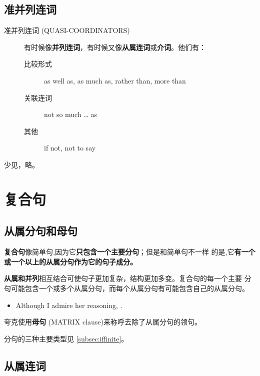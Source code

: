 \subsection{准并列连词}
\label{subsec:quasicoor}

\begin{description}
\item[准并列连词 (QUASI-COORDINATORS)]  有时候像\textbf{并列连词}，有时候又像\textbf{从属连词}或\textbf{介词}。他们有：
  \begin{description}
  \item[比较形式] as well as, as much as, rather than, more than

  \item[关联连词] not so much \ldots{} as
  \item[其他] if not, not to say
  \end{description}
\end{description}

少见，略。

\section{复合句}

\subsection{从属分句和母句}

\textbf{复合句}像简单句,因为它\textbf{只包含一个主要分句}；但是和简单句不一样
的是,它\textbf{有一个或一个以上的从属分句作为它的句子成分。}

\textbf{从属和并列}相互结合可使句子更加复杂，结构更加多变。复合句的每一个主要
分句可能包含一个或多个从属分句，而每个从属分句有可能包含自己的从属分句。

\begin{itemize}
\item Although I admire her reasoning, .
\end{itemize}

夸克使用\textbf{母句} (MATRIX clause)来称呼去除了从属分句的领句。

分句的三种主要类型见 \cref{subsec:iffinite}。

\subsection{从属连词}
\label{subsec:subcon}

